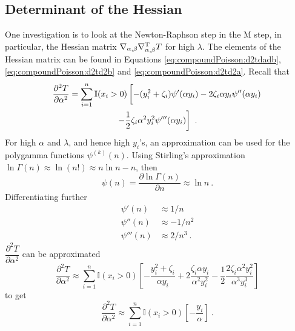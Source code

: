 \subsection{Determinant of the Hessian}

One investigation is to look at the Newton-Raphson step in the M step, in particular, the Hessian matrix $\nabla_{\alpha,\beta}\nabla_{\alpha,\beta}^\textup{T} T$ for high $\lambda$. The elements of the Hessian matrix can be found in Equations \eqref{eq:compoundPoisson:d2tdadb}, \eqref{eq:compoundPoisson:d2td2b} and \eqref{eq:compoundPoisson:d2td2a}. Recall that
\begin{multline*}
  \frac{\partial^2 T}{\partial \alpha^2} = 
  \sum_{i=1}^n\mathbb{I}(x_i>0)\left[
    -(y_i^2+\zeta_i)\psi'(\alpha y_i) - 2\zeta_i\alpha y_i\psi''(\alpha y_i)
    \vphantom{\frac{1}{2}}
  \right.
  \\
  \left.  
    -\frac{1}{2}\zeta_i\alpha^2y_i^2\psi'''(\alpha y_i)
  \right]
  \ .
\end{multline*}
For high $\alpha$ and $\lambda$, and hence high $y_i$'s, an approximation can be used for the polygamma functions $\psi^{(k)}(n)$. Using Stirling's approximation $\ln\Gamma(n)\approx\ln(n!)\approx n\ln n-n$, then
\begin{equation}
  \psi(n) = \frac{\partial\ln\Gamma(n)}{\partial n} \approx \ln n
  \ .
\end{equation}
Differentiating further
\begin{align}
  \psi'(n) &\approx 1/n \\
  \psi''(n) & \approx -1/n^2 \\
  \psi'''(n) & \approx 2/n^3
  \ .
\end{align}
$\dfrac{\partial^2T}{\partial\alpha^2}$ can be approximated
\begin{equation*}
  \frac{\partial^2 T}{\partial \alpha^2} \approx 
  \sum_{i=1}^n\mathbb{I}(x_i>0)
  \left[
    -\frac{y_i^2+\zeta_i}{\alpha y_i} + 2\frac{\zeta_i\alpha y_i}{\alpha^2 y_i^2}
    -\frac{1}{2}\frac{2\zeta_i\alpha^2y_i^2}{\alpha^3 y_i^3}
  \right]
\end{equation*}
to get
\begin{equation}
  \frac{\partial^2 T}{\partial \alpha^2} \approx 
  \sum_{i=1}^n\mathbb{I}(x_i>0)
  \left[
    -\frac{y_i}{\alpha}
  \right]
  \ .
\end{equation}

